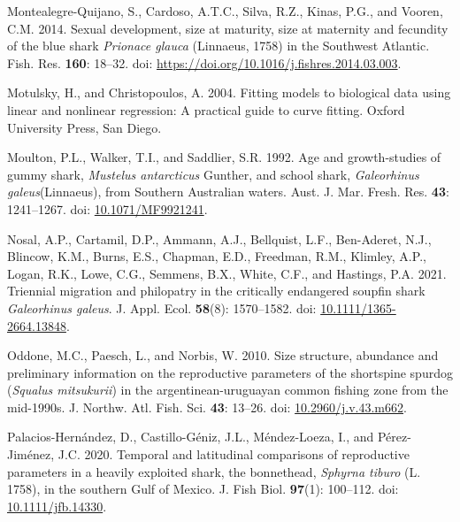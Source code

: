 \documentclass[
]{article}
\newenvironment{CSLReferences}%
  {}%
  {\par}
\begin{document}
\begin{CSLReferences}{1}{0}
Montealegre-Quijano, S., Cardoso, A.T.C., Silva, R.Z., Kinas, P.G., and Vooren, C.M. 2014. Sexual development, size at maturity, size at maternity and fecundity of the blue shark \emph{{Prionace} glauca} ({Linnaeus}, 1758) in the {Southwest} {Atlantic}. Fish. Res. \textbf{160}: 18--32. doi: \url{https://doi.org/10.1016/j.fishres.2014.03.003}.

Motulsky, H., and Christopoulos, A. 2004. Fitting models to biological data using linear and nonlinear regression: A practical guide to curve fitting. Oxford University Press, San Diego.

Moulton, P.L., Walker, T.I., and Saddlier, S.R. 1992. Age and growth-studies of gummy shark, \emph{{Mustelus} antarcticus} {Gunther}, and school shark, \emph{{Galeorhinus} galeus}({Linnaeus}), from {Southern} {Australian} waters. Aust. J. Mar. Fresh. Res. \textbf{43}: 1241--1267. doi: \href{https://doi.org/10.1071/MF9921241}{10.1071/MF9921241}.

Nosal, A.P., Cartamil, D.P., Ammann, A.J., Bellquist, L.F., Ben-Aderet, N.J., Blincow, K.M., Burns, E.S., Chapman, E.D., Freedman, R.M., Klimley, A.P., Logan, R.K., Lowe, C.G., Semmens, B.X., White, C.F., and Hastings, P.A. 2021. Triennial migration and philopatry in the critically endangered soupfin shark {\emph{Galeorhinus galeus}}. J. Appl. Ecol. \textbf{58}(8): 1570--1582. doi: \href{https://doi.org/10.1111/1365-2664.13848}{10.1111/1365-2664.13848}.

Oddone, M.C., Paesch, L., and Norbis, W. 2010. Size structure, abundance and preliminary information on the reproductive parameters of the shortspine spurdog (\emph{{Squalus} mitsukurii}) in the argentinean-uruguayan common fishing zone from the mid-1990s. J. Northw. Atl. Fish. Sci. \textbf{43}: 13--26. doi: \href{https://doi.org/10.2960/j.v.43.m662}{10.2960/j.v.43.m662}.

Palacios-Hernández, D., Castillo-Géniz, J.L., Méndez-Loeza, I., and Pérez-Jiménez, J.C. 2020. Temporal and latitudinal comparisons of reproductive parameters in a heavily exploited shark, the bonnethead, \emph{{Sphyrna} tiburo} ({L}. 1758), in the southern {Gulf} of {Mexico}. J. Fish Biol. \textbf{97}(1): 100--112. doi: \href{https://doi.org/10.1111/jfb.14330}{10.1111/jfb.14330}.


\end{CSLReferences}
\end{document}
